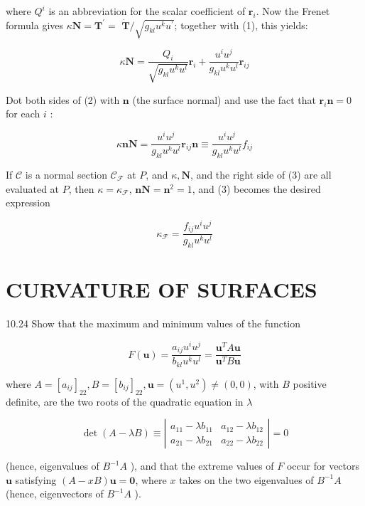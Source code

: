 \documentclass[10pt]{article}
\begin{document}
where $Q^{i}$ is an abbreviation for the scalar coefficient of $\mathbf{r}_{i}$. Now the Frenet formula gives $\kappa \mathbf{N}=\mathbf{T}^{\prime}=$ $\dot{\mathbf{T}} / \sqrt{g_{k l} u^{k} u^{\prime}}$; together with (1), this yields:


\begin{equation*}
\kappa \mathbf{N}=\frac{Q_{i}}{\sqrt{g_{k l} u^{k} u^{l}}} \mathbf{r}_{i}+\frac{u^{i} u^{j}}{g_{k l} u^{k} u^{l}} \mathbf{r}_{i j} \tag{2}
\end{equation*}


Dot both sides of (2) with $\mathbf{n}$ (the surface normal) and use the fact that $\mathbf{r}_{i} \mathbf{n}=0$ for each $i$ :


\begin{equation*}
\kappa \mathbf{n} \mathbf{N}=\frac{u^{i} u^{j}}{g_{k l} u^{k} u^{l}} \mathbf{r}_{i j} \mathbf{n} \equiv \frac{u^{i} u^{j}}{g_{k l} u^{k} u^{l}} f_{i j} \tag{3}
\end{equation*}


If $\mathscr{C}$ is a normal section $\mathscr{C}_{\mathscr{F}}$ at $P$, and $\kappa, \mathbf{N}$, and the right side of (3) are all evaluated at $P$, then $\kappa=\kappa_{\mathscr{F}}$, $\mathbf{n N}=\mathbf{n}^{2}=1$, and (3) becomes the desired expression

$$
\kappa_{\mathscr{F}}=\frac{f_{i j} u^{i} u^{j}}{g_{k l} u^{k} u^{l}}
$$

\section*{CURVATURE OF SURFACES}
10.24 Show that the maximum and minimum values of the function

$$
F(\mathbf{u})=\frac{a_{i j} u^{i} u^{j}}{b_{k l} u^{k} u^{l}}=\frac{\mathbf{u}^{T} A \mathbf{u}}{\mathbf{u}^{T} B \mathbf{u}}
$$

where $A=\left[a_{i j}\right]_{22}, B=\left[b_{i j}\right]_{22}, \mathbf{u}=\left(u^{1}, u^{2}\right) \neq(0,0)$, with $B$ positive definite, are the two roots of the quadratic equation in $\lambda$

\[
\operatorname{det}(A-\lambda B) \equiv\left|\begin{array}{ll}
a_{11}-\lambda b_{11} & a_{12}-\lambda b_{12}  \tag{1}\\
a_{21}-\lambda b_{21} & a_{22}-\lambda b_{22}
\end{array}\right|=0
\]

(hence, eigenvalues of $B^{-1} A$ ), and that the extreme values of $F$ occur for vectors $\mathbf{u}$ satisfying $(A-x B) \mathbf{u}=\mathbf{0}$, where $x$ takes on the two eigenvalues of $B^{-1} A$ (hence, eigenvectors of $B^{-1} A$ ).
\end{document}

